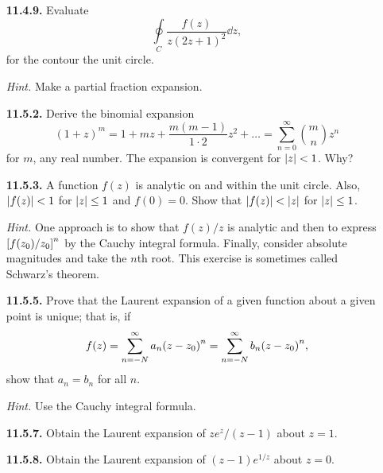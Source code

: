 \documentclass{article}
\begin{document}
\begin{enumerate}


\item [\textbf{11.4.9.}] Evaluate
\[
    \oint\limits_C \frac{f(z)}{z(2z+1)^2}\dd{z},
\]
for the contour the unit circle.

\textit{Hint.} Make a partial fraction expansion.



\item [\textbf{11.5.2.}] Derive the binomial expansion
\[
    (1+z)^m = 1 + mz + \frac{m(m-1)}{1\cdot 2}z^2 + \ldots = \sum_{n=0}^\infty \binom{m}{n}z^n
\]
for $m$, any real number. The expansion is convergent for $\abs{z}<1$. Why?



\item [\textbf{11.5.3.}] A function $f(z)$ is analytic on and within the unit circle. Also, $\abs{f(z)}<1$ for $\abs{z}\leq 1$ and $f(0) = 0$. Show that $\abs{f(z)}< \abs{z}$ for $\abs{z}\leq 1$.

\textit{Hint.} One approach is to show that $f(z)/z$ is analytic and then to express $\bqty{f(z_0)/z_0}^n$ by the Cauchy integral formula. Finally, consider absolute magnitudes and take the $n$th root. This exercise is sometimes called Schwarz's theorem.



\item [\textbf{11.5.5.}] Prove that the Laurent expansion of a given function about a given point is unique; that is, if
\[
    f(z) = \sum_{n=-N}^\infty a_n\pqty{z-z_0}^n = \sum_{n=-N}^\infty b_n\pqty{z-z_0}^n,
\]
show that $a_n = b_n$ for all $n$.

\textit{Hint.} Use the Cauchy integral formula.



\item [\textbf{11.5.7.}] Obtain the Laurent expansion of $ze^z/(z-1)$ about $z=1$.



\item [\textbf{11.5.8.}] Obtain the Laurent expansion of $(z-1)e^{1/z}$ about $z=0$.

\end{enumerate}
\end{document}
